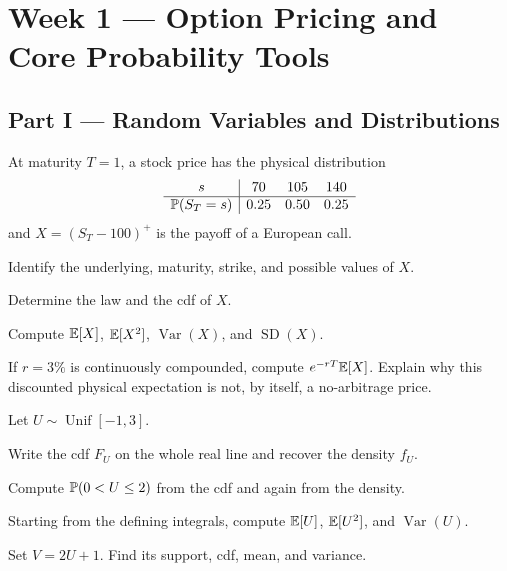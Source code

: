 
\section{Week 1 --- Option Pricing and Core Probability Tools}

\subsection*{Part I --- Random Variables and Distributions}

\begin{exercise}
At maturity $T=1$, a stock price has the physical distribution
\[
\begin{array}{c|ccc}
s & 70 & 105 & 140\\ \hline
\mathbb{P}(S_T=s) & 0.25 & 0.50 & 0.25
\end{array}
\]
and $X=(S_T-100)^+$ is the payoff of a European call.
\begin{exparts}
  \item Identify the underlying, maturity, strike, and possible values of $X$.
  \item Determine the law and the cdf of $X$.
  \item Compute $\mathbb{E}[X]$, $\mathbb{E}[X^2]$, $\operatorname{Var}(X)$, and
  $\operatorname{SD}(X)$.
  \item If $r=3\%$ is continuously compounded, compute $e^{-rT}\mathbb{E}[X]$.
  Explain why this discounted physical expectation is not, by itself, a
  no-arbitrage price.
\end{exparts}
\end{exercise}

\begin{exercise}
Let $U\sim\operatorname{Unif}[-1,3]$.
\begin{exparts}
  \item Write the cdf $F_U$ on the whole real line and recover the density $f_U$.
  \item Compute $\mathbb{P}(0<U\leq2)$ from the cdf and again from the density.
  \item Starting from the defining integrals, compute $\mathbb{E}[U]$, $\mathbb{E}[U^2]$,
  and $\operatorname{Var}(U)$.
  \item Set $V=2U+1$. Find its support, cdf, mean, and variance.
\end{exparts}
\end{exercise}

